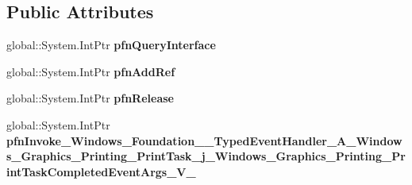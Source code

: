 \subsection*{Public Attributes}
\begin{DoxyCompactItemize}
\item 
\mbox{\label{struct_windows_1_1_foundation_1_1_typed_event_handler___a___windows___graphics___printing___prin4bbc544b6b23befe2861ab142a886e61_a4d25d8ed1b769bc611ce184fae2f68ba}} 
global\+::\+System.\+Int\+Ptr {\bfseries pfn\+Query\+Interface}
\item 
\mbox{\label{struct_windows_1_1_foundation_1_1_typed_event_handler___a___windows___graphics___printing___prin4bbc544b6b23befe2861ab142a886e61_a105b2ec18f6091bad124903a06946856}} 
global\+::\+System.\+Int\+Ptr {\bfseries pfn\+Add\+Ref}
\item 
\mbox{\label{struct_windows_1_1_foundation_1_1_typed_event_handler___a___windows___graphics___printing___prin4bbc544b6b23befe2861ab142a886e61_a6788428cb65c9c9f15d5033d0e3c0db1}} 
global\+::\+System.\+Int\+Ptr {\bfseries pfn\+Release}
\item 
\mbox{\label{struct_windows_1_1_foundation_1_1_typed_event_handler___a___windows___graphics___printing___prin4bbc544b6b23befe2861ab142a886e61_af0aa234ab5e0cb1943cfab8eb9b40bb3}} 
global\+::\+System.\+Int\+Ptr {\bfseries pfn\+Invoke\+\_\+\+Windows\+\_\+\+Foundation\+\_\+\+\_\+\+Typed\+Event\+Handler\+\_\+\+A\+\_\+\+Windows\+\_\+\+Graphics\+\_\+\+Printing\+\_\+\+Print\+Task\+\_\+j\+\_\+\+Windows\+\_\+\+Graphics\+\_\+\+Printing\+\_\+\+Print\+Task\+Completed\+Event\+Args\+\_\+\+V\+\_\+}
\end{DoxyCompactItemize}

